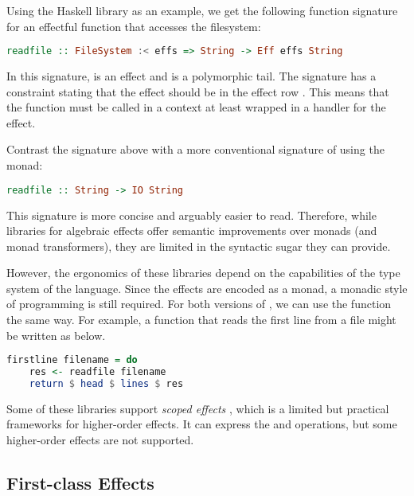 Using the  Haskell library as an example, we get the following function signature for an effectful function that accesses the filesystem:
\begin{lstlisting}[language=Haskell,style=fancy]
readfile :: FileSystem :< effs => String -> Eff effs String
\end{lstlisting}
In this signature,  is an effect and  is a polymorphic tail. The signature has a constraint stating that the  effect should be in the effect row . This means that the  function must be called in a context at least wrapped in a handler for the  effect.

Contrast the signature above with a more conventional signature of  using the  monad:
\begin{lstlisting}[language=Haskell,style=fancy]
readfile :: String -> IO String
\end{lstlisting}
This signature is more concise and arguably easier to read. Therefore, while libraries for algebraic effects offer semantic improvements over monads (and monad transformers), they are limited in the syntactic sugar they can provide.

However, the ergonomics of these libraries depend on the capabilities of the type system of the language. Since the effects are encoded as a monad, a monadic style of programming is still required. For both versions of , we can use the function the same way. For example, a function that reads the first line from a file might be written as below.
\begin{lstlisting}[language=Haskell,style=fancy,mathescape=false]
firstline filename = do
    res <- readfile filename
    return $ head $ lines $ res    
\end{lstlisting}

Some of these libraries support \emph{scoped effects} \autocite{wu_effect_2014}, which is a limited but practical frameworks for higher-order effects. It can express the \olocal and \ocatch operations, but some higher-order effects are not supported.

\subsection{First-class Effects}

